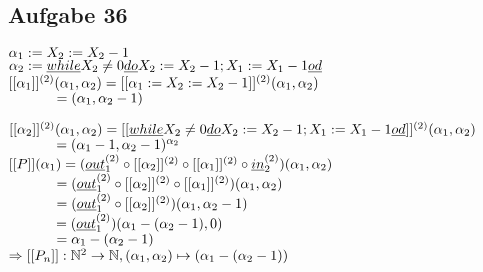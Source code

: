 \documentclass[11pt]{amsart}
\begin{document}
\subsection*{Aufgabe 36}
\( \alpha_1 := X_2 := X_2 - 1 \) \\
\( \alpha_2 := \underline{while} X_2 \not = 0 \underline{do} X_2 := X_2 - 1 ; X_1 := X_1 - 1 \underline{od} \) \\

\( [[\alpha_1]]^{(2)}(\alpha_1,\alpha_2) = [[\alpha_1 := X_2 := X_2 - 1]]^{(2)}(\alpha_1,\alpha_2) \) \\
\( \hspace*{1.2cm} = (\alpha_1,\alpha_2 - 1) \)

\( [[\alpha_2]]^{(2)}(\alpha_1,\alpha_2) = [[\underline{while} X_2 \not = 0 \underline{do} X_2 := X_2 - 1 ; X_1 := X_1 - 1 \underline{od}]]^{(2)}(\alpha_1,\alpha_2) \) \\
\( \hspace*{1.2cm} = (\alpha_1 - 1, \alpha_2 - 1)^{\alpha_2} \) \\ 

\( [[P]](\alpha_1) = (\underline{out}^{(2)}_1 \circ [[\alpha_2]]^{(2)} \circ [[\alpha_1]]^{(2)} \circ \underline{in}^{(2)}_2)(\alpha_1,\alpha_2) \) \\
\( \hspace*{1.2cm} = (\underline{out}^{(2)}_1 \circ [[\alpha_2]]^{(2)} \circ [[\alpha_1]]^{(2)})(\alpha_1,\alpha_2) \) \\
\( \hspace*{1.2cm} = (\underline{out}^{(2)}_1 \circ [[\alpha_2]]^{(2)})(\alpha_1,\alpha_2 - 1) \) \\
\( \hspace*{1.2cm} = (\underline{out}^{(2)}_1) (\alpha_1 - (\alpha_2-1), 0) \) \\
\( \hspace*{1.2cm} = \alpha_1 - (\alpha_2 - 1) \) \\
\( \Rightarrow [[P_n]] : \mathbb{N}^2 \rightarrow \mathbb{N} , (\alpha_1,\alpha_2) \mapsto (\alpha_1 - (\alpha_2 -1)) \) \\
\end{document}
